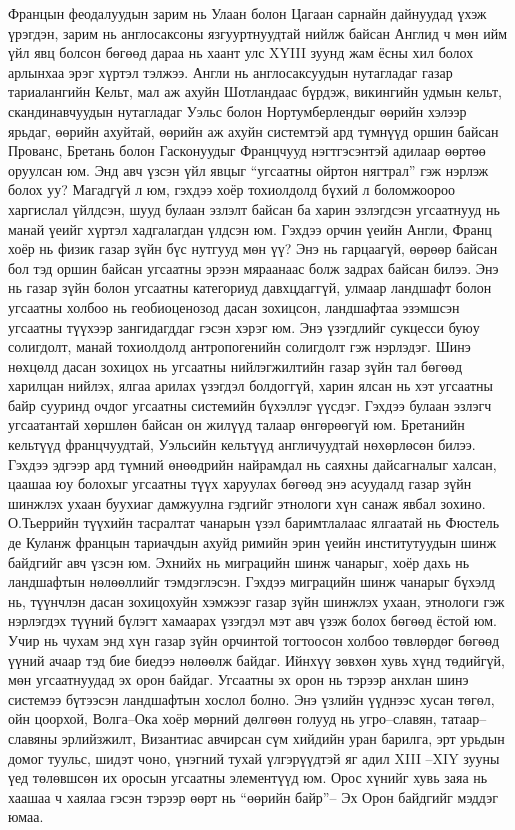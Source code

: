 Францын феодалуудын зарим нь Улаан болон Цагаан сарнайн дайнуудад үхэж үрэгдэн, зарим нь англосаксоны язгууртнуудтай нийлж байсан Англид ч мөн ийм үйл явц болсон бөгөөд дараа нь хаант улс XYIII зуунд жам ёсны хил болох арлынхаа эрэг хүртэл тэлжээ. Англи нь англосаксуудын нутагладаг газар тариалангийн Кельт, мал аж ахуйн Шотландаас бүрдэж, викингийн удмын кельт, скандинавчуудын нутагладаг Уэльс болон Нортумберлендыг өөрийн хэлээр ярьдаг, өөрийн ахуйтай, өөрийн аж ахуйн системтэй ард түмнүүд оршин байсан Прованс, Бретань болон Гасконуудыг Францчууд нэгтгэсэнтэй адилаар өөртөө оруулсан юм.
Энд авч үзсэн үйл явцыг “угсаатны ойртон нягтрал” гэж нэрлэж болох уу? Магадгүй л юм, гэхдээ хоёр тохиолдолд бүхий л боломжоороо харгислал үйлдсэн, шууд булаан эзлэлт байсан ба харин эзлэгдсэн угсаатнууд нь манай үеийг хүртэл хадгалагдан үлдсэн юм. Гэхдээ орчин үеийн Англи, Франц хоёр нь физик газар зүйн бүс нутгууд мөн үү? Энэ нь гарцаагүй, өөрөөр байсан бол тэд оршин байсан угсаатны эрээн мяраанаас болж задрах байсан билээ. Энэ нь газар зүйн болон угсаатны категориуд давхцдаггүй, улмаар ландшафт болон угсаатны холбоо нь геобиоценозод дасан зохицсон, ландшафтаа эзэмшсэн угсаатны түүхээр зангидагддаг гэсэн хэрэг юм.
Энэ үзэгдлийг сукцесси буюу солигдолт, манай тохиолдолд антропогенийн солигдолт гэж нэрлэдэг. Шинэ нөхцөлд дасан зохицох нь угсаатны нийлэгжилтийн газар зүйн тал бөгөөд харилцан нийлэх, ялгаа арилах үзэгдэл болдоггүй, харин ялсан нь хэт угсаатны байр сууринд очдог угсаатны системийн бүхэллэг үүсдэг. Гэхдээ булаан эзлэгч угсаатантай хөршлөн байсан он жилүүд талаар өнгөрөөгүй юм. Бретанийн кельтүүд францчуудтай, Уэльсийн кельтүүд англичуудтай нөхөрлөсөн билээ. Гэхдээ эдгээр ард түмний өнөөдрийн найрамдал нь саяхны дайсагналыг халсан, цаашаа юу болохыг угсаатны түүх харуулах бөгөөд энэ асуудалд газар зүйн шинжлэх ухаан буухиаг дамжуулна гэдгийг этнологи хүн санаж явбал зохино.
О.Тьеррийн түүхийн тасралтат чанарын үзэл баримтлалаас ялгаатай нь Фюстель де Куланж францын тариачдын ахуйд римийн эрин үеийн институтуудын шинж байдгийг авч үзсэн юм. Эхнийх нь миграцийн шинж чанарыг, хоёр дахь нь ландшафтын нөлөөллийг тэмдэглэсэн. Гэхдээ миграцийн шинж чанарыг бүхэлд нь, түүнчлэн дасан зохицохуйн хэмжээг газар зүйн шинжлэх ухаан, этнологи гэж нэрлэгдэх түүний бүлэгт хамаарах үзэгдэл мэт авч үзэж болох бөгөөд ёстой юм. Учир нь чухам энд хүн газар зүйн орчинтой тогтоосон холбоо төвлөрдөг бөгөөд үүний ачаар тэд бие биедээ нөлөөлж байдаг.
Ийнхүү зөвхөн хувь хүнд төдийгүй, мөн угсаатнуудад эх орон байдаг. Угсаатны эх орон нь тэрээр анхлан шинэ системээ бүтээсэн ландшафтын хослол болно. Энэ үзлийн үүднээс хусан төгөл, ойн цоорхой, Волга–Ока хоёр мөрний дөлгөөн голууд нь угро–славян, татаар–славяны эрлийзжилт, Византиас авчирсан сүм хийдийн уран барилга, эрт урьдын домог туульс, шидэт чоно, үнэгний тухай үлгэрүүдтэй яг адил XIII –XIY зууны үед төлөвшсөн их оросын угсаатны элементүүд юм. Орос хүнийг хувь заяа нь хаашаа ч хаялаа гэсэн тэрээр өөрт нь “өөрийн байр”– Эх Орон байдгийг мэддэг юмаа.
